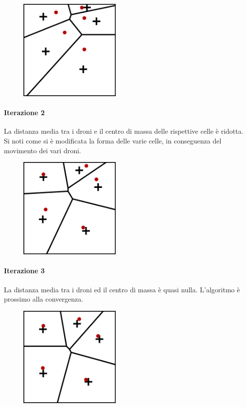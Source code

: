 \documentclass[11pt,a4paper]{report}
\begin{document}
\begin{figure}[H]
\includegraphics[width=5cm]{lloyd_iterazione_1.png}
\centering
\end{figure}

\paragraph{Iterazione 2}

La distanza media tra i droni e il centro di massa delle rispettive celle è ridotta. Si noti come si è modificata la forma delle varie celle, in conseguenza del movimento dei vari droni.

\begin{figure}[H]
\includegraphics[width=5cm]{lloyd_iterazione_2.png}
\centering
\end{figure}

\paragraph{Iterazione 3}

La distanza media tra i droni ed il centro di massa è quasi nulla. L'algoritmo è prossimo alla convergenza.

\begin{figure}[H]
\includegraphics[width=5cm]{lloyd_iterazione_3.png}
\centering
\end{figure}
\end{document}
